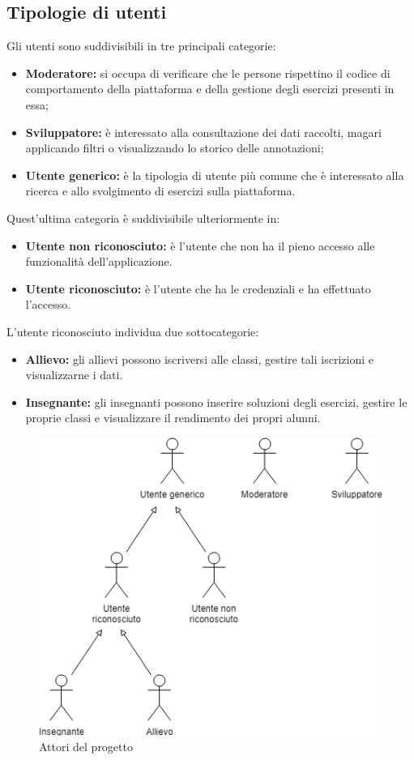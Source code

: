 \subsection{Tipologie di utenti}
Gli utenti sono suddivisibili in tre principali categorie: 
\begin{itemize}
	\item \textbf{Moderatore:} si occupa di verificare che le persone rispettino il codice di comportamento della piattaforma e della gestione degli esercizi presenti in essa;
	\item \textbf{Sviluppatore:} è interessato alla consultazione dei dati raccolti, magari applicando filtri o visualizzando lo storico delle annotazioni;
	\item \textbf{Utente generico:} è la tipologia di utente più comune che è interessato alla ricerca e allo svolgimento di esercizi sulla piattaforma.
\end{itemize}

Quest'ultima categoria è suddivisibile ulteriormente in:
\begin{itemize}
	\item \textbf{Utente non riconosciuto:} è l'utente che non ha il pieno accesso alle funzionalità dell'applicazione.
	\item \textbf{Utente riconosciuto:} è l'utente che ha le credenziali e ha effettuato l'accesso.
\end{itemize}

L'utente riconosciuto individua due sottocategorie:
\begin{itemize}
	\item \textbf{Allievo:} gli allievi possono iscriversi alle classi, gestire tali iscrizioni e visualizzarne i dati.
	\item \textbf{Insegnante:} gli insegnanti possono inserire soluzioni degli esercizi, gestire le proprie classi e visualizzare il rendimento dei propri alunni.
\end{itemize}
\begin{figure}[h]
			\centering
			\includegraphics[scale=0.7]{images/attori.png}
			\caption{Attori del progetto}
		\end{figure}
		
